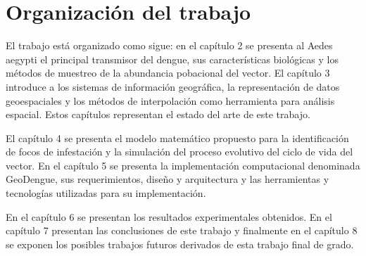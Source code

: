 \section{Organización del trabajo}
El trabajo está organizado como sigue: en el capítulo 2 se presenta al Aedes aegypti el principal
transmisor del dengue, sus características biológicas y los métodos de muestreo de la abundancia
pobacional del vector. El capítulo 3 introduce a los sistemas de información geográfica, la
representación de datos geoespaciales y los métodos de interpolación como herramienta para
análisis espacial. Estos capítulos representan el estado del arte de este trabajo.

El capítulo 4 se presenta el modelo matemático propuesto para la identificación de focos de
infestación y la simulación del proceso evolutivo del ciclo de vida del vector. En el capítulo 5
se presenta la implementación computacional denominada GeoDengue, sus requerimientos, diseño y
arquitectura y las herramientas y tecnologías utilizadas para su implementación.

En el capítulo 6 se presentan los resultados experimentales obtenidos. En el capítulo 7
presentan las conclusiones de este trabajo y finalmente en el capítulo 8 se exponen los posibles
trabajos futuros derivados de esta trabajo final de grado.
